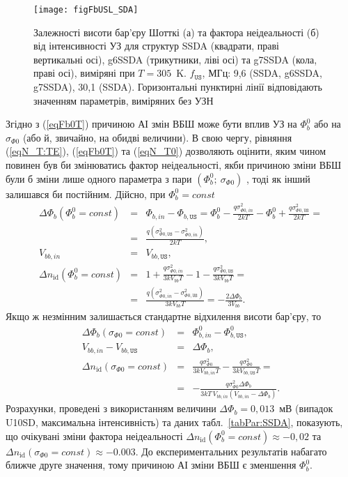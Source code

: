 \begin{figure}
\center
\texttt{[image: figFbUSL\_SDA]}
\caption{\label{figFbUSL_SDA}
Залежності висоти бар'єру Шотткі (а) та фактора неідеальності (б)  від інтенсивності УЗ для
структур SSDA (квадрати, праві вертикальні осі), g6SSDA (трикутники, ліві осі) та g7SSDA (кола, праві осі), виміряні при $T=305$~K.
$f_\mathtt{US}$, МГц: 9,6 (SSDA, g6SSDA, g7SSDA), 30,1 (SSDA).
Горизонтальні пунктирні лінії відповідають значенням параметрів, виміряних без УЗН
}%
\end{figure}

Згідно з (\ref{eqFb0T}) причиною АІ змін ВБШ може бути вплив УЗ на $\Phi_b^0$ або на $\sigma_{\Phi0}$ (або й, звичайно, на обидві величини).
В свою чергу, рівняння  (\ref{eqN_T:TE}), (\ref{eqFb0T}) та (\ref{eqN_T0}) дозволяють оцінити, яким чином повинен був би змінюватись фактор неідеальності,
якби причиною зміни ВБШ були б зміни лише одного параметра з пари $(\Phi_b^0;\:\sigma_{\Phi0})$ , тоді як інший залишався би постійним.
Дійсно, при $\Phi_b^0=const$
\begin{eqnarray*}
  \Delta \Phi_b (\Phi_b^0=const)&=& \Phi_{b,in}-\Phi_{b,\mathtt{US}}=\Phi_b^0-\frac{q\sigma^2_{\Phi0,in}}{2kT}-\Phi_b^0+\frac{q\sigma^2_{\Phi0,\mathtt{US}}}{2kT}= \\
   &=&\frac{q\left(\sigma^2_{\Phi0,\mathtt{US}}-\sigma^2_{\Phi0,in}\right)}{2kT}, \\
   V_{bb,in}&=&V_{bb,\mathtt{US}},\\
  \Delta n_{\mathrm{id}} (\Phi_b^0=const)&=&1+\frac{q\sigma_{\Phi0,in}^2}{3kV_{bb}T}-1-\frac{q\sigma_{\Phi0,\mathtt{US}}^2}{3kV_{bb}T}=\\
  &=&\frac{q\left(\sigma^2_{\Phi0,in}-\sigma^2_{\Phi0,\mathtt{US}}\right)}{3kV_{bb}T}=-\frac{2\Delta \Phi_b}{3V_{bb}}.
\end{eqnarray*}
Якщо ж незмінним залишається стандартне відхилення висоти бар'єру, то
\begin{eqnarray*}
  \Delta \Phi_b (\sigma_{\Phi0}=const)&=&\Phi_{b,in}^0-\Phi_{b,\mathtt{US}}^0,\\
  V_{bb,in}-V_{bb,\mathtt{US}}&=&\Delta \Phi_b,\\
  \Delta n_{\mathrm{id}} (\sigma_{\Phi0}=const)&=&\frac{q\sigma_{\Phi0}^2}{3kV_{bb,in}T}-\frac{q\sigma_{\Phi0}^2}{3kV_{bb,\mathtt{US}}T}=\\
  &=&-\frac{q\sigma_{\Phi0}^2\Delta \Phi_b}{3kT\,V_{bb,in}(V_{bb,in}-\Delta \Phi_b)}.
\end{eqnarray*}
Розрахунки, проведені з використанням величини $\Delta \Phi_b=0,013$~мВ (випадок U10SD, максимальна інтенсивність) та даних табл.~\ref{tabPar:SSDA},
показують, що очікувані зміни фактора неідеальності $\Delta n_{\mathrm{id}} (\Phi_b^0=const)\approx-0,02$ та \mbox{$\Delta n_{\mathrm{id}}(\sigma_{\Phi0}=const)\approx-0.003$}.
До експериментальних результатів набагато ближче друге значення, тому причиною АІ зміни ВБШ є зменшення $\Phi_b^0$.

